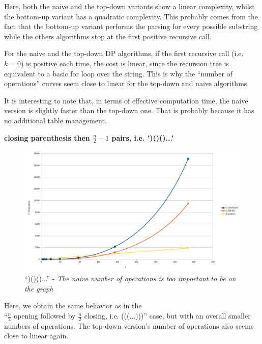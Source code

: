 \documentclass[]{article}
\begin{document}
\begin{multicols}{2}


Here, both the naive and the top-down variants show a linear complexity, whilst the bottom-up variant has a quadratic complexity. This probably comes from the fact that the bottom-up variant performs the parsing for every possible substring while the others algorithms stop at the first positive recursive call.

For the naive and the top-down DP algorithms, if the first recursive call (i.e.
$k=0$) is positive each time, the cost is linear, since the recursion tree is
equivalent to a basic for loop over the string. This is why the ``number of
operations'' curves seem close to linear for the top-down and naive algorithms.

It is interesting to note that, in terms of effective computation time, the
naive version is slightly faster than the top-down one. That is probably because it has no additional table management.

\end{multicols}
\newpage
\textbf{closing parenthesis then $\frac n2-1$ pairs, i.e. ')()()...'}\\
\begin{figure}[h]
  \label{fig:plr}
  \includegraphics[width=\textwidth]{paren/complexity_closing_paren_left_right}
  \caption{``)()()...'' - \textit{The naive number of operations is too important to be on
      the graph}}
\end{figure}
\begin{multicols}{2}

Here, we obtain the same behavior as in the \\``$\frac n2$ opening followed by $\frac n2$
closing, i.e. (((...)))'' case, but with an overall smaller numbers of
operations. The top-down version's number of operations also seems close to linear again.


\end{multicols}
\end{document}
